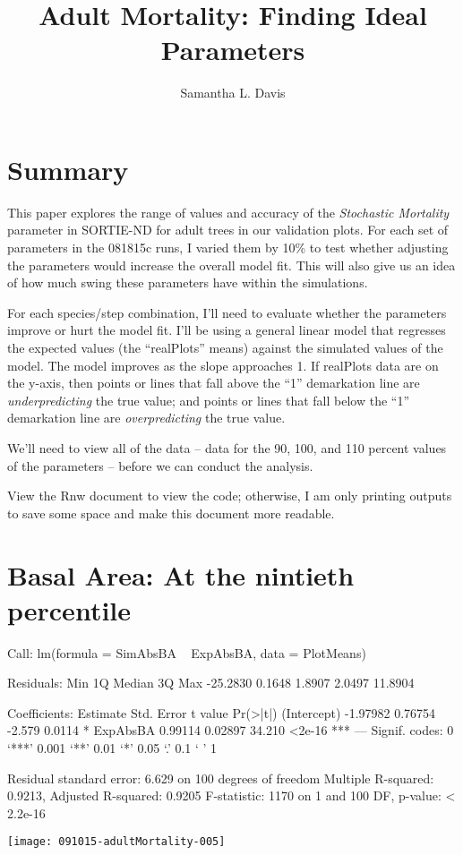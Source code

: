 \documentclass{article}
\begin{document}


\title{Adult Mortality: Finding Ideal Parameters}
\author{Samantha L. Davis}

\maketitle

\section{Summary}
This paper explores the range of values and accuracy of the \textit{Stochastic Mortality} parameter in SORTIE-ND for adult trees in our validation plots. For each set of parameters in the 081815c runs, I varied them by 10\% to test whether adjusting the parameters would increase the overall model fit. This will also give us an idea of how much swing these parameters have within the simulations. 

For each species/step combination, I'll need to evaluate whether the parameters improve or hurt the model fit. I'll be using a general linear model that regresses the expected values (the ``realPlots'' means) against the simulated values of the model. The model improves as the slope approaches 1. If realPlots data are on the y-axis, then points or lines that fall above the ``1'' demarkation line are \textit{underpredicting} the true value; and points or lines that fall below the ``1'' demarkation line are \textit{overpredicting} the true value.

We'll need to view all of the data -- data for the 90, 100, and 110 percent values of the parameters -- before we can conduct the analysis. 

View the Rnw document to view the code; otherwise, I am only printing outputs to save some space and make this document more readable.







\newpage

\section{Basal Area: At the nintieth percentile}
\begin{Schunk}
\begin{Soutput}
Call:
lm(formula = SimAbsBA ~ ExpAbsBA, data = PlotMeans)

Residuals:
     Min       1Q   Median       3Q      Max 
-25.2830   0.1648   1.8907   2.0497  11.8904 

Coefficients:
            Estimate Std. Error t value Pr(>|t|)    
(Intercept) -1.97982    0.76754  -2.579   0.0114 *  
ExpAbsBA     0.99114    0.02897  34.210   <2e-16 ***
---
Signif. codes:  0 ‘***’ 0.001 ‘**’ 0.01 ‘*’ 0.05 ‘.’ 0.1 ‘ ’ 1

Residual standard error: 6.629 on 100 degrees of freedom
Multiple R-squared:  0.9213,	Adjusted R-squared:  0.9205 
F-statistic:  1170 on 1 and 100 DF,  p-value: < 2.2e-16
\end{Soutput}
\end{Schunk}
\texttt{[image: 091015-adultMortality-005]}
\end{document}
